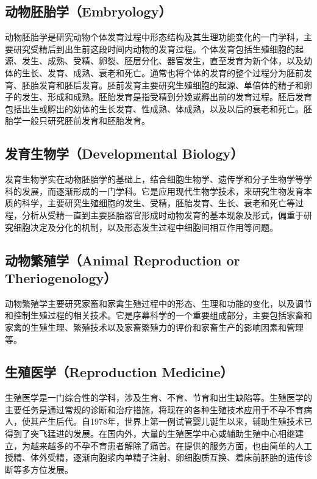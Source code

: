 \subsection{动物胚胎学（Embryology）}

动物胚胎学是研究动物个体发育过程中形态结构及其生理功能变化的一门学科，主要研究受精后到出生前这段时间内动物的发育过程。个体发育包括生殖细胞的起源、发生、成熟、受精、卵裂、胚层分化、器官发生，直至发育为新个体，以及幼体的生长、发育、成熟、衰老和死亡。通常也将个体的发育的整个过程分为胚前发育、胚胎发育和胚后发育。胚前发育主要研究生殖细胞的起源、单倍体的精子和卵子的发生、形成和成熟。胚胎发育是指受精到分娩或孵出前的发育过程。胚后发育包括出生或孵出的幼体的生长发育、性成熟、体成熟，以及以后的衰老和死亡。胚胎学一般只研究胚前发育和胚胎发育。

\subsection{发育生物学（Developmental Biology）}

发育生物学实在动物胚胎学的基础上，结合细胞生物学、遗传学和分子生物学等学科的发展，而逐渐形成的一门学科。它是应用现代生物学技术，来研究生物发育本质的科学，主要研究生殖细胞的发生、受精，胚胎发育、生长、衰老和死亡等过程，分析从受精一直到主要胚胎器官形成时动物发育的基本现象及形式，偏重于研究细胞决定及分化的机制，以及形态发生过程中细胞间相互作用等问题。

\subsection{动物繁殖学（Animal Reproduction or Theriogenology）}

动物繁殖学主要研究家畜和家禽生殖过程中的形态、生理和功能的变化，以及调节和控制生殖过程的相关技术。它是序幕科学的一个重要组成部分，主要包括家畜和家禽的生殖生理、繁殖技术以及家畜繁殖力的评价和家畜生产的影响因素和管理等。

\subsection{生殖医学（Reproduction Medicine）}

生殖医学是一门综合性的学科，涉及生育、不育、节育和出生缺陷等。生殖医学的主要任务是通过常规的诊断和治疗措施，将现在的各种生殖技术应用于不孕不育病人，使其产生后代。自1978年，世界上第一例试管婴儿诞生以来，辅助生殖技术已得到了突飞猛进的发展。在国内外，大量的生殖医学中心或辅助生殖中心相继建立，为越来越多的不孕不育患者解除了痛苦。在提供的服务方面，也由简单的人工授精、体外受精，逐渐向胞浆内单精子注射、卵细胞质互换、着床前胚胎的遗传诊断等多方位发展。


